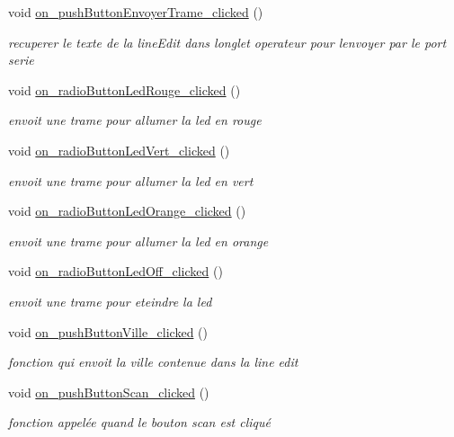 \begin{DoxyCompactItemize}
void \hyperlink{class_ihm_afd32da9e614eba44bb1d3630b48e6075}{on\+\_\+push\+Button\+Envoyer\+Trame\+\_\+clicked} ()
\begin{DoxyCompactList}\small\item\em recuperer le texte de la line\+Edit dans l\textquotesingle{}onglet operateur pour l\textquotesingle{}envoyer par le port serie \end{DoxyCompactList}\item 
void \hyperlink{class_ihm_a731ee780915cb90a5dfb11f2e02144c9}{on\+\_\+radio\+Button\+Led\+Rouge\+\_\+clicked} ()
\begin{DoxyCompactList}\small\item\em envoit une trame pour allumer la led en rouge \end{DoxyCompactList}\item 
void \hyperlink{class_ihm_afef5bfaa83383427e615d21d9474f466}{on\+\_\+radio\+Button\+Led\+Vert\+\_\+clicked} ()
\begin{DoxyCompactList}\small\item\em envoit une trame pour allumer la led en vert \end{DoxyCompactList}\item 
void \hyperlink{class_ihm_a7e000e198b11fc38a4459f7749561ded}{on\+\_\+radio\+Button\+Led\+Orange\+\_\+clicked} ()
\begin{DoxyCompactList}\small\item\em envoit une trame pour allumer la led en orange \end{DoxyCompactList}\item 
void \hyperlink{class_ihm_a1e328a2e8165bbef347e901f1bc5534d}{on\+\_\+radio\+Button\+Led\+Off\+\_\+clicked} ()
\begin{DoxyCompactList}\small\item\em envoit une trame pour eteindre la led \end{DoxyCompactList}\item 
void \hyperlink{class_ihm_aa943965aa565ec50e00f433100660892}{on\+\_\+push\+Button\+Ville\+\_\+clicked} ()
\begin{DoxyCompactList}\small\item\em fonction qui envoit la ville contenue dans la line edit \end{DoxyCompactList}\item 
void \hyperlink{class_ihm_a277763bdb63ed529aafba7db513cb630}{on\+\_\+push\+Button\+Scan\+\_\+clicked} ()
\begin{DoxyCompactList}\small\item\em fonction appelée quand le bouton scan est cliqué \end{DoxyCompactList}\item 

\end{DoxyCompactItemize}
